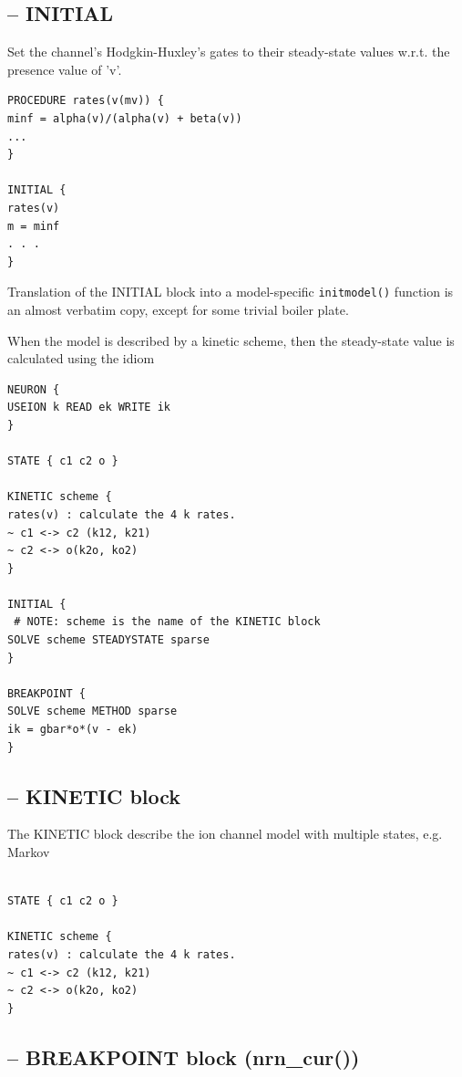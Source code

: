 \subsection{-- INITIAL}
\label{sec:NMODL-block-INITIAL}

Set the channel's Hodgkin-Huxley's gates to their steady-state values w.r.t. the
presence value of 'v'.

\begin{verbatim}
PROCEDURE rates(v(mv)) {
minf = alpha(v)/(alpha(v) + beta(v))
...
}

INITIAL {
rates(v)
m = minf
. . .
}
\end{verbatim}
Translation of the INITIAL block into a model-specific \verb!initmodel()!
function is an almost verbatim copy, except for some trivial boiler plate.

When the model is described by a kinetic scheme, then the steady-state value is
calculated using the idiom
\begin{verbatim}
NEURON {
USEION k READ ek WRITE ik
}

STATE { c1 c2 o }

KINETIC scheme {
rates(v) : calculate the 4 k rates.
~ c1 <-> c2 (k12, k21)
~ c2 <-> o(k2o, ko2)
}

INITIAL {
 # NOTE: scheme is the name of the KINETIC block
SOLVE scheme STEADYSTATE sparse
}

BREAKPOINT {
SOLVE scheme METHOD sparse
ik = gbar*o*(v - ek)
}
\end{verbatim}

\subsection{-- KINETIC block}
\label{sec:KINETIC-block-NEURON}

The KINETIC block describe the ion channel model with multiple states, e.g.
Markov
\begin{verbatim}

STATE { c1 c2 o }

KINETIC scheme {
rates(v) : calculate the 4 k rates.
~ c1 <-> c2 (k12, k21)
~ c2 <-> o(k2o, ko2)
}

\end{verbatim}

\subsection{-- BREAKPOINT block (nrn\_cur())}
\label{sec:NMODL-block-BREAKPOINT}
\label{sec:BREAKPOINT-block-NEURON}

